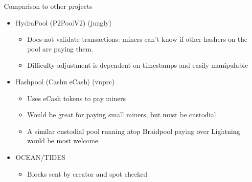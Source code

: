 \documentclass[tikz,mathserif,usenames,dvipsnames,svgnames,table]{beamer}
\newlength{\wideitemsep}
\newlength{\narrowitemsep}
\let\olditem\item
\renewcommand{\item}{\setlength{\itemsep}{\wideitemsep}\olditem}
\newcommand{\nitem}{\setlength{\itemsep}{\narrowitemsep}\olditem}
\begin{document}
\begin{frame}{Comparison to other projects}
    \begin{itemize}
        \item HydraPool (P2PoolV2) (jungly)
            \begin{itemize}
                \item Does not validate transactions: miners can't know if other
                    hashers on the pool are paying them.
                \item Difficulty adjustment is dependent on timestamps and
                    easily manipulable
            \end{itemize}
        \item Hashpool (Cashu eCash) (vnprc)
            \begin{itemize}
                \item Uses eCash tokens to pay miners
                \item Would be great for paying small miners, but must be
                    custodial
                \item A similar custodial pool running atop Braidpool paying
                    over Lightning would be most welcome
            \end{itemize}
        \item OCEAN/TIDES
            \begin{itemize}
                \item Blocks sent by creator and spot checked
            \end{itemize}
    \end{itemize}

\end{frame}
\end{document}
